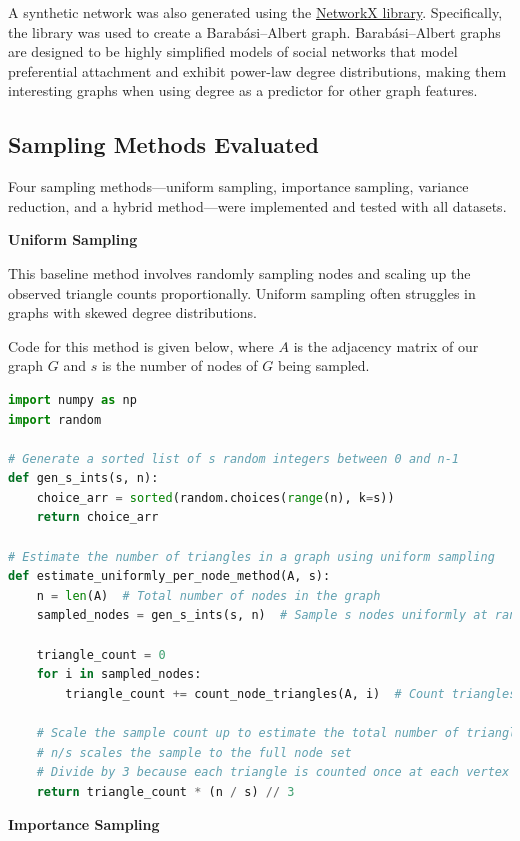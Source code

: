 \documentclass[11pt, margin=1in]{article}
\begin{document}
A synthetic network was also generated using the \href{https://networkx.org/}{NetworkX library}.
Specifically, the library was used to create a Barabási–Albert \cite{albert_statistical_2002} graph.
Barabási–Albert graphs are designed to be highly simplified models of social networks that model preferential attachment and exhibit power-law degree distributions, making them interesting graphs when using degree as a predictor for other graph features.

\subsection{Sampling Methods Evaluated}

Four sampling methods—uniform sampling, importance sampling, variance reduction, and a hybrid method—were implemented and tested with all datasets.

\textbf{Uniform Sampling}

This baseline method involves randomly sampling nodes and scaling up the observed triangle counts proportionally.
Uniform sampling often struggles in graphs with skewed degree distributions.

Code for this method is given below, where $A$ is the adjacency matrix of our graph $G$ and $s$ is the number of nodes of $G$ being sampled.

{
\singlespacing
\begin{lstlisting}[language=Python]
import numpy as np
import random

# Generate a sorted list of s random integers between 0 and n-1
def gen_s_ints(s, n):
    choice_arr = sorted(random.choices(range(n), k=s))
    return choice_arr

# Estimate the number of triangles in a graph using uniform sampling
def estimate_uniformly_per_node_method(A, s):
    n = len(A)  # Total number of nodes in the graph
    sampled_nodes = gen_s_ints(s, n)  # Sample s nodes uniformly at random

    triangle_count = 0
    for i in sampled_nodes:
        triangle_count += count_node_triangles(A, i)  # Count triangles involving node i

    # Scale the sample count up to estimate the total number of triangles
    # n/s scales the sample to the full node set
    # Divide by 3 because each triangle is counted once at each vertex
    return triangle_count * (n / s) // 3
\end{lstlisting}
}

\textbf{Importance Sampling}
\end{document}

